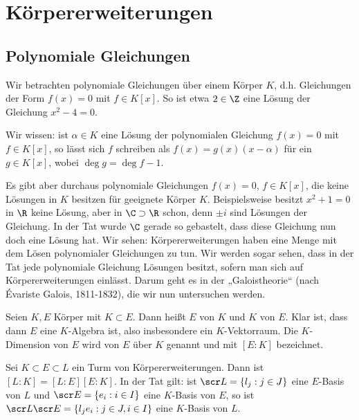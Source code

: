 \chapter{Körpererweiterungen}


\section{Polynomiale Gleichungen}

Wir betrachten polynomiale Gleichungen über einem Körper $K$, d.h. Gleichungen der Form $f(x) = 0$ mit $f \in K[x]$.
So ist etwa $2 \in \Z$ eine Lösung der Gleichung $x^2 - 4 = 0$.

Wir wissen: ist $\alpha \in K$ eine Lösung der polynomialen Gleichung $f(x) = 0$ mit $f \in K[x]$, so lässt sich $f$ schreiben als $f(x) = g(x)(x - \alpha)$ für ein $g \in K[x]$, wobei $\deg g = \deg f - 1$.

Es gibt aber durchaus polynomiale Gleichungen $f(x) = 0$, $f \in K[x]$, die keine Lösungen in $K$ besitzen für geeignete Körper $K$.
Beispielsweise besitzt $x^2 + 1 = 0$ in $\R$ keine Lösung, aber in $\C \supset \R$ schon, denn $\pm i$ sind Lösungen der Gleichung.
In der Tat wurde $\C$ gerade so gebastelt, dass diese Gleichung nun doch eine Lösung hat.
Wir sehen: Körpererweiterungen haben eine Menge mit dem Lösen polynomialer Gleichungen zu tun.
Wir werden sogar sehen, dass in der Tat jede polynomiale Gleichung Lösungen besitzt, sofern man sich auf Körpererweiterungen einlässt.
Darum geht es in der „Galoistheorie“ (nach Évariste Galois, 1811-1832), die wir nun untersuchen werden.

\begin{df} \label{18.1-1}
	Seien $K, E$ Körper mit $K \subset E$.
	Dann heißt $E$  von $K$ und $K$  von $E$.
	Klar ist, dass dann $E$ eine $K$-Algebra ist, also insbesondere ein $K$-Vektorraum.
	Die $K$-Dimension von $E$ wird  von $E$ über $K$ genannt und mit $[E : K]$ bezeichnet.
\end{df}

\begin{st} \label{18.1-2}
	Sei $K \subset E \subset L$ ein Turm von Körpererweiterungen.
	Dann ist $[L : K] = [L : E] [E : K]$.
	In der Tat gilt: ist $\scr L = \{l_j : j \in J\}$ eine $E$-Basis von $L$ und $\scr E = \{ e_i : i \in I \}$ eine $K$-Basis von $E$, so ist $\scr L \scr E = \{ l_j e_i : j \in J, i \in I \}$ eine $K$-Basis von $L$.
\end{st}


